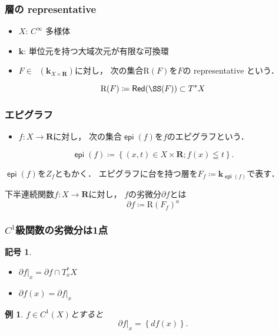 \documentclass[dvipdfmx,12pt,aspectratio=169,leqno]{beamer}%
\newcommand{\rr}{\mathbf{R}}
\newcommand{\kk}{\mathbf{k}}
\newcommand{\p}{\partial}
\numberwithin{equation}{subsection}
\newcommand{\Dompb}{\mathop{\mathsf{D}^\mathrm{b}}\nolimits}
\newcommand{\mres}[2][]{{\left.{#1}\right\rvert}_{#2}}
\newcommand{\Red}{\mathop{\mathsf{Red}}\nolimits}
\newcommand{\epi}{\mathop{\mathsf{epi}}\nolimits}
\theoremstyle{mystyle}
\newtheorem{EG}[AXM]{例}
\newtheorem{NTN}[AXM]{記号}
\begin{document}
\begin{frame}
    \frametitle{層の representative}

    \begin{itemize}
        \item \(X\): \(C^\infty\) 多様体
        \item \(\mathbf{k}\): 単位元を持つ大域次元が有限な可換環
    \end{itemize}
    
    \begin{definition}[層の representative]
        \begin{itemize}
            \item \(F\in \Dompb(\kk_{X\times \rr})\)に対し，
            次の集合\(\mathrm{R}(F)\)を\(F\)の representative という．
        \end{itemize}
        \[\mathrm{R}(F)\coloneqq\Red(\SS(F))\subset T^{\ast}X\]
    \end{definition}

\end{frame}

\begin{frame}
    \frametitle{エピグラフ}
    
    \begin{definition}
        \begin{itemize}
            \item \(f\colon X\to \rr\)に対し，
            次の集合\(\epi(f)\)を\(f\)のエピグラフという．
        \end{itemize}
        \[
            \epi(f)\coloneqq
            \left\{(x,t)\in X\times \rr;f(x)\leqq t\right\}.
        \]
    \end{definition}
    \(\epi(f)\)を\(Z_f\)ともかく．
    エピグラフに台を持つ層を\(
            F_{f}\coloneqq\kk_{\epi(f)}\)で表す．
    \begin{definition}[ホモロジカル劣微分]
        下半連続関数\(f\colon X\to \rr\)に対し，
        \(f\)の劣微分\(\p f\)とは
        \[\p f\coloneqq \mathrm{R}(F_{f})^{a}\]
    \end{definition}

\end{frame}

\begin{frame}
    \frametitle{\(C^1\)級関数の劣微分は1点}
    \begin{NTN}
        \begin{itemize}
            \item \(\mres[\partial f]{x}=\partial f\cap T^{\ast}_{x}X\)
            \item \(\partial f(x)=\mres[\partial f]{x}\)
        \end{itemize}
    \end{NTN}
    \begin{EG}
        \(f\in C^{1}(X)\)とすると\[
            \mres[\partial f]{x}=\left\{df(x)\right\}.
        \]
    \end{EG}
\end{frame}
\end{document}
